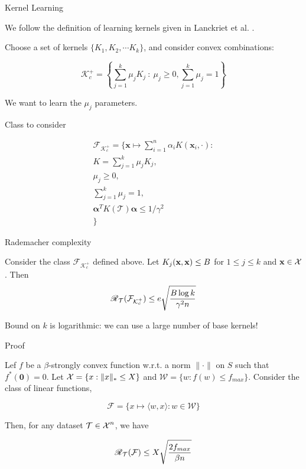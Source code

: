 \begin{frame}{Kernel Learning}

  We follow the definition of learning kernels given in Lanckriet et al. \cite{lanckriet2004learning}.

  Choose a set of kernels $\{K_1, K_2, \cdots K_k\}$, and consider convex combinations:

  \[ \mathcal{K}^+_c = \left\{ \sum^k_{j=1} \mu_j K_j ~:~ \mu_j \geq 0, \sum^k_{j=1} \mu_j = 1 \right\}  \]

  We want to learn the $\mu_j$ parameters. 

\end{frame}


\begin{frame}{Class to consider}

  \begin{multline}
    \mathcal{F}_{\mathcal{K}^+_c} = \{ \mathbf{x} \mapsto \sum_{i=1}^n \alpha_i K(\mathbf{x}_i, \cdot) : \\
    K = \sum_{j=1}^k \mu_j K_j, \\
    \mu_j \geq 0,\\
    \sum_{j=1}^k \mu_j = 1, \\
    \boldsymbol\alpha^T K(\mathcal{T}) \boldsymbol\alpha \leq 1 / \gamma^2 \\
    \} 
  \end{multline}
  
\end{frame}

\begin{frame}{Rademacher complexity}


  \begin{theorem}
    Consider the class $\mathcal{F}_{\mathcal{K}^+_c}$ defined above. Let $K_j(\operatorname{\mathbf{x}},\operatorname{\mathbf{x}}) \leq B$ for $1 \leq j \leq k$ and $\operatorname{\mathbf{x}} \in \operatorname{\mathcal{X}}$. Then
    \[ \operatorname{\mathscr{R}}_{\mathcal{T}}(\mathcal{F}_{\mathcal{K}^+_c}) \leq e \sqrt{\frac{B \log k}{\gamma^2 n}} \]
  \end{theorem}
  
  Bound on $k$ is logarithmic: we can use a large number of base kernels!
  
\end{frame}


\begin{frame}{Proof}

  \begin{theorem}[9 Generalization]
    Lef $f$ be a $\beta$-strongly convex function w.r.t. a norm $\|\cdot \|$ on $S$ such that
    $f^*(\mathbf{0}) = 0$. Let $\operatorname{\mathcal{X}} = \{ x : \|x\|_* \leq X\}$ and $\mathcal{W} = \{ w : f(w) \leq f_{max} \}$.
    Consider the class of linear functions,

    \[ \mathcal{F} = \{ x \mapsto \langle w,x \rangle : w \in \mathcal{W} \}  \]

    Then, for any dataset $\mathcal{T} \in \operatorname{\mathcal{X}}^n$, we have

    \[ \operatorname{\mathscr{R}}_{\mathcal{T}}(\mathcal{F}) \leq X \sqrt{ \frac{2f_{max}}{\beta n}  } \]
  \end{theorem}
      

  
\end{frame}


